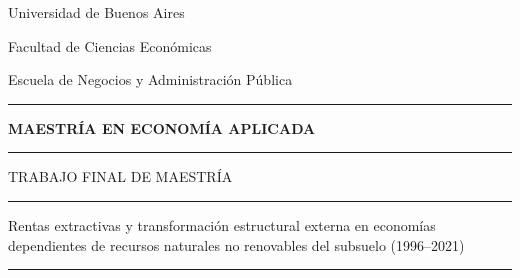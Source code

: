 \documentclass[12pt,a4paper]{report}
\newcommand{\ShelfRule}{%
	\vspace{-0.15cm}
	\par\noindent
	\textcolor{lineblue}{\rule{\linewidth}{0.6pt}}%
}
\begin{document}
	\begin{titlepage}

		\begin{center}
			{\cambriafont\fontsize{26}{31}\selectfont Universidad de Buenos Aires}

			\vspace{0.25cm}

			{\cambriafont\fontsize{26}{31}\selectfont Facultad de Ciencias Económicas}

			\vspace{0.25cm}

			{\cambriafont\fontsize{20}{24}\selectfont Escuela de Negocios y Administración Pública}
		\end{center}

		\ShelfRule
		\vspace{1.2cm}

		\begin{center}
			{\cambriafont\fontsize{22}{26}\selectfont\textbf{MAESTRÍA EN ECONOMÍA APLICADA}}
		\end{center}

		\ShelfRule
		\vspace{1.5cm}

		\begin{center}
			{\cambriafont\fontsize{22}{26}\selectfont TRABAJO FINAL DE MAESTRÍA}
		\end{center}

		\ShelfRule
		\vspace{1.5cm}

		\begin{center}
			\begin{minipage}{0.9\textwidth}
				\noindent\justifying
				{\cambriafont\fontsize{18}{22}\selectfont
					Rentas extractivas y transformación estructural externa en economías dependientes de recursos naturales no renovables del subsuelo (1996–2021)}
			\end{minipage}
		\end{center}

		\ShelfRule
		\vspace{1.8cm}


\end{titlepage}
\end{document}
